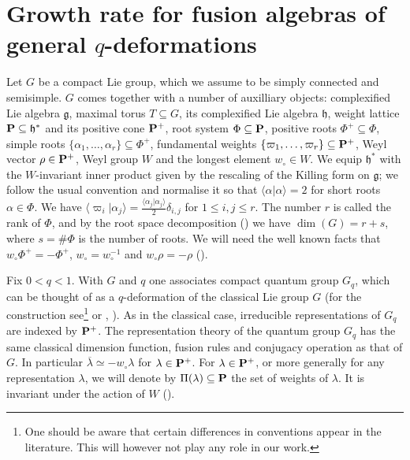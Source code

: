 \documentclass[11 pt, leqno]{amsart}
\newcommand{\ov}{\overline}
\newcommand{\mf}{\mathfrak}
\newcommand{\la}{\langle}
\newcommand{\ra}{\rangle}
\theoremstyle{definition}
\numberwithin{equation}{section}
\begin{document}
\section{Growth rate for fusion algebras of general $q$-deformations}\label{sec:qdef}

Let $G$ be a compact Lie group, which we assume to be simply connected and semisimple. $G$ comes together with a number of auxilliary objects: complexified Lie algebra $\mf{g}$, maximal torus $T\subseteq G$, its complexified Lie algebra $\mf{h}$, weight lattice $\bf{P}\subseteq\mf{h}^*$ and its positive cone $\bf{P}^+$, root system $\Phi\subseteq \bf{P}$, positive roots $\Phi^+\subseteq \Phi$, simple roots $\{\alpha_1,\dotsc,\alpha_r\}\subseteq \Phi^+$, fundamental weights $\{\varpi_1,\dotsc,\varpi_r\}\subseteq \bf{P}^+$, Weyl vector $\rho\in \bf{P}^+$, Weyl group $W$ and the longest element $w_\circ\in W$. We equip $\mf{h}^*$ with the $W$-invariant inner product given by the rescaling of the Killing form on $\mf{g}$; we follow the usual convention and normalise it so that $\la \alpha|\alpha\ra=2$ for short roots $\alpha\in\Phi$. We have $\la \varpi_i|\alpha_j\ra = \tfrac{\la \alpha_j|\alpha_j\ra}{2} \delta_{i,j}$ for $1\le i,j\le r$. The number $r$ is called the rank of $\Phi$, and by the root space decomposition (\cite[Section II.8]{Humphreys}) we have $\dim(G)=r+s$, where $s=\# \Phi$ is the number of roots. We will need the well known facts that $w_\circ\Phi^+=-\Phi^+$, $w_\circ=w_\circ^{-1}$ and $w_\circ \rho=-\rho$ (\cite[Exercise 20.2]{Bump}).

Fix $0<q<1$. With $G$ and $q$ one associates compact quantum group $G_q$, which can be thought of as a $q$-deformation of the classical Lie group $G$ (for the construction see\footnote{One should be aware that certain differences in conventions appear in the literature. This  will however not  play any role in our work.} \cite[Section 2.4]{NeshveyevTuset} or \cite[Section 5.3]{DeCommer}, \cite[Section 4]{KrajczokSoltan}). As in the classical case, irreducible representations of $G_q$ are indexed by ${\bf{P}}^+$. The representation theory of the  quantum group $G_q$ has the same classical dimension function,  fusion rules and conjugacy operation as that of $G$. In particular  $\ov{\lambda}\simeq -w_\circ \lambda$ for $\lambda\in \bf{P}^+$. For $\lambda\in \bf{P}^+$, or more generally for any representation $\lambda$, we will denote by $\Pi(\lambda)\subseteq \bf{P}$ the set of weights of $\lambda$. It is invariant under the action of $W$ (\cite[Chapter 21]{Bump}).
\end{document}
